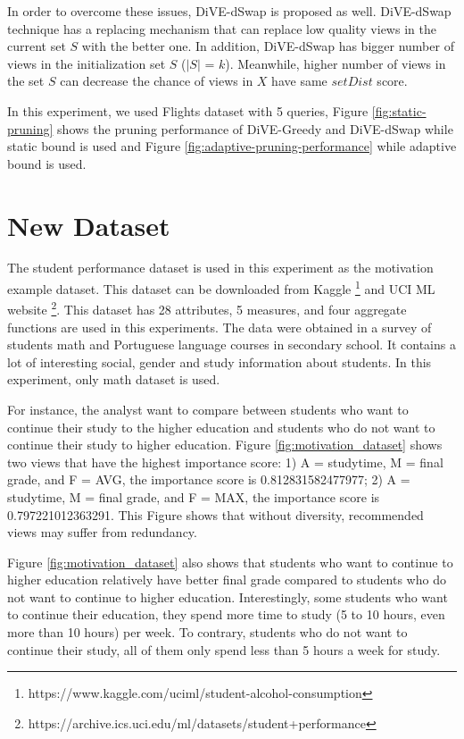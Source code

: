 \documentclass{article}
\begin{document}
In order to overcome these issues, DiVE-dSwap is proposed as well. DiVE-dSwap technique has a replacing mechanism that can replace low quality views in the current set $S$ with the better one. In addition, DiVE-dSwap has bigger number of views in the initialization set $S$ ($|S|$ = $k$). Meanwhile, higher number of views in the set $S$ can decrease the chance of views in $X$ have same $ setDist $ score.  


In this experiment, we used Flights dataset with 5 queries, Figure \ref{fig:static-pruning} shows the pruning performance of DiVE-Greedy and DiVE-dSwap while static bound is used and Figure \ref{fig:adaptive-pruning-performance} while adaptive bound is used. 



\section{New Dataset}

The student performance dataset is used in this experiment as the motivation example dataset. This dataset can be downloaded from Kaggle \footnote{https://www.kaggle.com/uciml/student-alcohol-consumption} and UCI ML website \footnote{https://archive.ics.uci.edu/ml/datasets/student+performance}. This dataset has 28 attributes, 5 measures, and four aggregate functions are used in this experiments. The data were obtained in a survey of students math and Portuguese language courses in secondary school. It contains a lot of interesting social, gender and study information about students. In this experiment, only math dataset is used. 

For instance, the analyst want to compare between students who want to continue their study to the higher education and students who do not want to continue their study to higher education. Figure \ref{fig:motivation_dataset} shows two views that have the highest importance score: 1) A = studytime, M = final grade, and F = AVG, the importance score is 0.812831582477977; 2) A = studytime, M = final grade, and F = MAX, the importance score is 0.797221012363291. This Figure shows that without diversity, recommended views may suffer from redundancy. 


Figure \ref{fig:motivation_dataset} also shows that students who want to continue to higher education relatively have better final grade compared to students who do not want to continue to higher education. Interestingly, some students who want to continue their education, they spend more time to study (5 to 10 hours, even more than 10 hours) per week. To contrary, students who do not want to continue their study, all of them only spend less than 5 hours a week for study.
\end{document}
